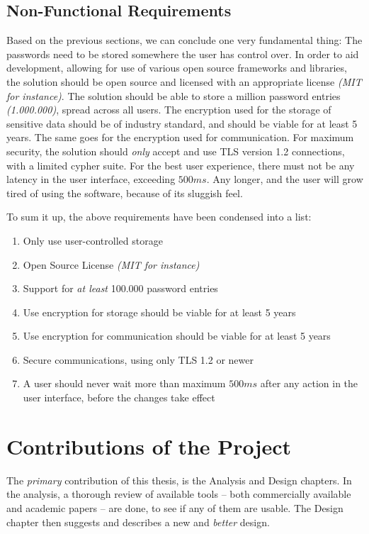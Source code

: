 		\subsection*{Non-Functional Requirements}
			Based on the previous sections, we can conclude one very fundamental thing: The passwords need to be stored somewhere the user has control over. In order to aid development, allowing for use of various open source frameworks and libraries, the solution should be open source and licensed with an appropriate license \emph{(MIT for instance)}. The solution should be able to store a million password entries \emph{(1.000.000)}, spread across all users. The encryption used for the storage of sensitive data should be of industry standard, and should be viable for at least 5 years. The same goes for the encryption used for communication. For maximum security, the solution should \emph{only} accept and use TLS version 1.2 connections, with a limited cypher suite. For the best user experience, there must not be any latency in the user interface, exceeding $500ms$. Any longer, and the user will grow tired of using the software, because of its sluggish feel.

			To sum it up, the above requirements have been condensed into a list:
			\vspace{-3ex}\begin{enumerate}
				\setlength\itemsep{0.1em}
				\item Only use user-controlled storage \label{requirement:user_storage}
				\item Open Source License \emph{(MIT for instance)} \label{requirement:open-source}
				\item Support for \emph{at least} 100.000 password entries \label{requirement:entries}
				\item Use encryption for storage should be viable for at least 5 years \label{requirement:encryption}
				\item Use encryption for communication should be viable for at least 5 years \label{requirement:comms}
				\item Secure communications, using only TLS 1.2 or newer \label{requirement:tls1.2}
				\item A user should never wait more than maximum $500ms$ after any action in the user interface, before the changes take effect \label{requirement:delay}
			\end{enumerate}

	\section{Contributions of the Project}
		The \emph{primary} contribution of this thesis, is the Analysis and Design chapters. In the analysis, a thorough review of available tools -- both commercially available and academic papers -- are done, to see if any of them are usable. The Design chapter then suggests and describes a new and \emph{better} design.

